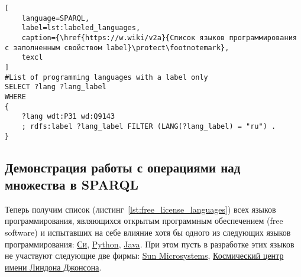 \label{question:prog_lang_1}

\begin{lstlisting}[
	language=SPARQL,
	label=lst:labeled_languages,
	caption={\href{https://w.wiki/v2a}{Список языков программирования с заполненным свойством label}\protect\footnotemark},
	texcl
]
#List of programming languages with a label only
SELECT ?lang ?lang_label
WHERE
{
    ?lang wdt:P31 wd:Q9143
    ; rdfs:label ?lang_label FILTER (LANG(?lang_label) = "ru") . 
}
\end{lstlisting}




\newpage
\subsection{Демонстрация работы с операциями над множества в SPARQL}
Теперь получим список (листинг~\ref{lst:free_license_languages}) всех языков программирования, являющихся открытым программным обеспечением (free software) и испытавших на себе влияние хотя бы одного из следующих языков программирования: \href{https://en.wikipedia.org/wiki/C_(programming_language)}{Си}, \href{https://ru.wikipedia.org/wiki/Python}{Python}, \href{https://ru.wikipedia.org/wiki/Java}{Java}. 
При этом пусть в разработке этих языков не участвуют следующие две фирмы: 
\href{https://ru.wikipedia.org/wiki/Sun_Microsystems}{Sun Microsystems}, 
\href{https://en.wikipedia.org/wiki/Johnson_Space_Center}{Космический центр имени Линдона Джонсона}.


